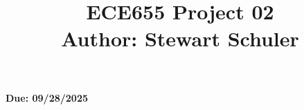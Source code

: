 \documentclass[a4paper,12pt]{article}
\begin{document}
 \title{ECE655 Project 02\\
                \vspace{4pt}
                \small{Author: Stewart Schuler}
                \vspace{-12pt}}
 \date{}
 \maketitle
 \begin{center}
 \textbf{Due: 09/28/2025}
 \end{center}

\tableofcontents





\end{document}
